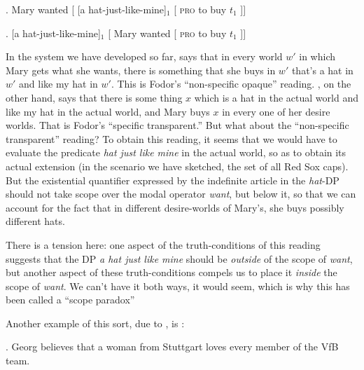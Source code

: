 \ex. Mary wanted [ [a hat-just-like-mine]$_{1}$ [ \textsc{pro} to buy $t_{1}$ ]]

\ex. [a hat-just-like-mine]$_{1}$ [ Mary wanted [ \textsc{pro} to buy $t_{1}$ ]]

In the system we have developed so far, \LLast says that in every world $w'$ in which Mary gets what she wants, there is something that she buys in $w'$ that's a hat in $w'$ and like my hat in $w'$. This is Fodor's ``non-specific opaque'' reading. \Last, on the other hand, says that there is some thing $x$ which is a hat in the actual world and like my hat in the actual world, and Mary buys $x$ in every one of her desire worlds. That is Fodor's ``specific transparent.'' But what about the ``non-specific transparent'' reading? To obtain this reading, it seems that we would have to evaluate the predicate \emph{hat just like mine} in the actual world, so as to obtain its actual extension (in the scenario we have sketched, the set of all Red Sox caps). But the existential quantifier expressed by the indefinite article in the \emph{hat}-DP should not take scope over the modal operator \emph{want}, but below it, so that we can account for the fact that in different desire-worlds of Mary's, she buys possibly different hats.

There is a tension here: one aspect of the truth-conditions of this reading suggests that the DP \emph{a hat just like mine} should be \emph{outside} of the scope of \emph{want}, but another aspect of these truth-conditions compels us to place it \emph{inside} the scope of \emph{want}. We can't have it both ways, it would seem, which is why this has been called a ``scope paradox''

Another example of this sort, due to \citet{bauerle:1983:nps}, is \Next:

\ex. Georg believes that a woman from Stuttgart loves every member of the VfB team.

